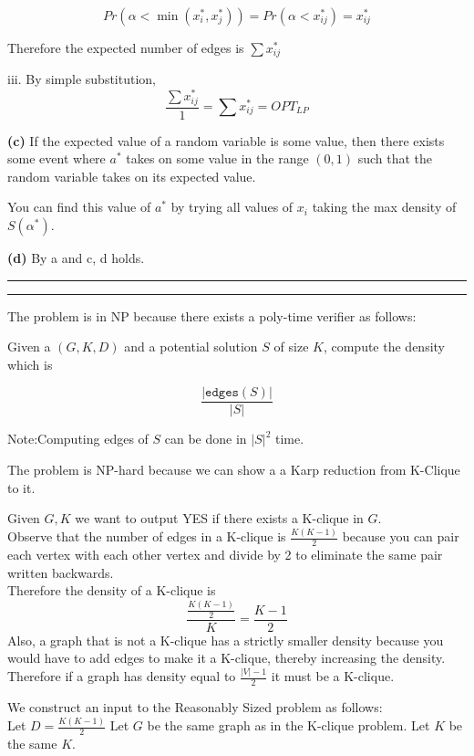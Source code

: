 \documentclass[11pt]{article}
\newcommand{\question}[2] {\vspace{.25in} \hrule\vspace{0.5em}
\noindent{\bf #1: #2} \vspace{0.5em}
\hrule \vspace{.10in}}
\renewcommand{\part}[1] {\vspace{.10in} {\bf (#1)}}
\begin{document}
$$Pr(\alpha < \min(x^*_i, x^*_j)) = Pr(\alpha < x^*_{ij}) = x^*_{ij}$$

Therefore the expected number of edges is $\sum x^*_{ij}$

iii. By simple substitution,
$$ \frac{\sum x^*_{ij}}{1} = \sum x^*_{ij} = OPT_{LP}$$

\part{c}
If the expected value of a random variable is some value, then there exists some
event where $a^*$ takes on some value in the range $(0,1)$ such that the random variable
takes on its expected value.

You can find this value of $a^*$ by trying all values of $x_i$ taking the max density of $S(\alpha^*)$.

\part{d}
By a and c, d holds.

\question{2}{Large + Dense = Difficult}
The problem is in NP because there exists a poly-time verifier as follows:

Given a $(G, K, D)$ and a potential solution $S$ of size $K$, compute the density which is

$$\frac{| \texttt{edges}(S) |}{|S|}$$

Note:Computing edges of $S$ can be done in $|S|^2$ time.

The problem is NP-hard because we can show a a Karp reduction from K-Clique to it.

Given $G, K$ we want to output YES if there exists a K-clique in $G$.\\

Observe that the number of edges in a K-clique is $\frac{K(K-1)}{2}$ because you can pair each vertex with each other vertex and divide by 2 to eliminate the same pair written backwards.\\
Therefore the density of a K-clique is $$\frac{\frac{K(K-1)}{2}}{K} = \frac{K-1}{2}$$
Also, a graph that is not a K-clique has a strictly smaller density because you would have to add edges to make it a K-clique, thereby increasing the density.\\
Therefore if a graph has density equal to $\frac{|V| - 1}{2}$ it must be a K-clique.

We construct an input to the Reasonably Sized problem as follows:\\
Let $D = \frac{K(K-1)}{2}$
Let $G$ be the same graph as in the K-clique problem.
Let $K$ be the same $K$.
\end{document}
